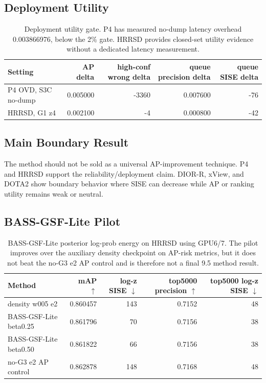 \documentclass[10pt]{article}
\begin{document}


\subsection{Deployment Utility}

\begin{table}[h]
\centering
\small
\begin{tabular}{lrrrr}
\toprule
Setting & AP delta & high-conf wrong delta & queue precision delta & queue SISE delta \\
\midrule
P4 OVD, S3C no-dump & 0.005000 & -3360 & 0.007600 & -76 \\
HRRSD, G1 z4 & 0.002100 & -4 & 0.000800 & -42 \\
\bottomrule
\end{tabular}
\caption{Deployment utility gate.  P4 has measured no-dump latency overhead
0.003866976, below the 2\% gate.  HRRSD provides closed-set utility evidence
without a dedicated latency measurement.}
\end{table}

\subsection{Main Boundary Result}

The method should not be sold as a universal AP-improvement technique.  P4 and
HRRSD support the reliability/deployment claim.  DIOR-R, xView, and DOTA2 show
boundary behavior where SISE can decrease while AP or ranking utility remains
weak or neutral.

\subsection{BASS-GSF-Lite Pilot}

\begin{table}[h]
\centering
\small
\begin{tabular}{lrrrr}
\toprule
Method & mAP $\uparrow$ & log-z SISE $\downarrow$ & top5000 precision $\uparrow$ & top5000 log-z SISE $\downarrow$ \\
\midrule
density w005 e2 & 0.860457 & 143 & 0.7152 & 48 \\
BASS-GSF-Lite beta0.25 & 0.861796 & 70 & 0.7156 & 38 \\
BASS-GSF-Lite beta0.50 & 0.861822 & 66 & 0.7156 & 38 \\
no-G3 e2 AP control & 0.862878 & 148 & 0.7168 & 48 \\
\bottomrule
\end{tabular}
\caption{BASS-GSF-Lite posterior log-prob energy on HRRSD using GPU6/7.
The pilot improves over the auxiliary density checkpoint on AP-risk metrics,
but it does not beat the no-G3 e2 AP control and is therefore not a final 9.5
method result.}
\end{table}
\end{document}
